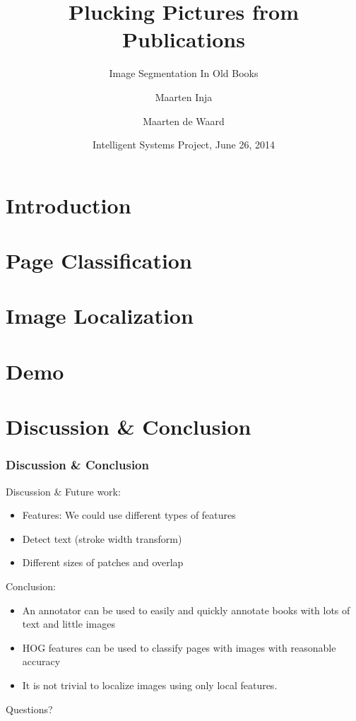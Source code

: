 \documentclass{beamer}
\title{Plucking Pictures from Publications}
\subtitle{Image Segmentation In Old Books}
\author{Maarten Inja \and Maarten de Waard}
\institute[UvA]{University of Amsterdam}
\date[2014]{Intelligent Systems Project, June 26, 2014}
\newcommand{\slide}[2]
{
\begin{frame}
\frametitle{#1} 

#2

\end{frame}
}
\begin{document}
\begin{frame}
\titlepage
\end{frame}

\section{Introduction}


\section{Page Classification}


\section{Image Localization}




\section{Demo}


\section{Discussion \& Conclusion} 

\slide{Discussion \& Conclusion}
{
	Discussion \& Future work:
	\begin{itemize}
		\item Features: We could use different types of features 
		\item Detect text (stroke width transform)
		\item Different sizes of patches and overlap
	\end{itemize}
	Conclusion:
	\begin{itemize}
		\item An annotator can be used to easily and quickly annotate books with
		lots of text and little images
		\item HOG features can be used to classify pages with images with
		reasonable accuracy
		\item It is not trivial to localize images using only local features.
	\end{itemize}
}
%         
%         

\begin{frame}
\begin{center}
Questions?
\end{center}
\end{frame}
\end{document}
